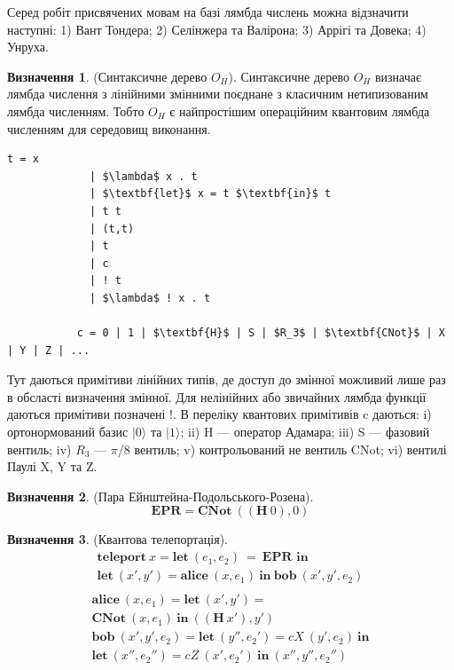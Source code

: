 \documentclass{article}
\theoremstyle{definition}
\newtheorem{definition}{Визначення}
\begin{document}
Серед робіт присвячених мовам на базі лямбда числень можна відзначити наступні:
1) Вант Тондера;
2) Селінжера та Валірона;
3) Аррігі та Довека;
4) Унруха.

\begin{definition} (Синтаксичне дерево $O_H$).
Синтаксичне дерево $O_H$ визначає лямбда числення з лінійними змінними
поєднане з класичним нетипизованим лямбда численням. Тобто $O_H$ є
найпростішим операційним квантовим лямбда численням для середовищ виконання.
\begin{lstlisting}[mathescape=true]
           t = x
             | $\lambda$ x . t
             | $\textbf{let}$ x = t $\textbf{in}$ t
             | t t
             | (t,t)
             | t
             | c
             | ! t
             | $\lambda$ ! x . t

           c = 0 | 1 | $\textbf{H}$ | S | $R_3$ | $\textbf{CNot}$ | X | Y | Z | ...
\end{lstlisting}
Тут даються примітиви лінійних типів, де доступ до змінної
можливий лише раз в обсласті визначення змінної. Для нелінійних або звичайних
лямбда функції даються примітиви позначені !. В переліку квантових примітивів
c даються:
i) ортонормований базис $|0\rangle$ та $|1\rangle$;
ii) H --- оператор Адамара;
iii) S --- фазовий вентиль;
iv) $R_3$ --- $\pi/8$ вентиль;
v) контрольований не вентиль CNot;
vi) вентилі Паулі X, Y та Z.
\end{definition}

\begin{definition} (Пара Ейнштейна-Подольського-Розена).
\begin{equation}
\textbf{EPR} = \textbf{CNot}\ ((\textbf{H}\ 0),0)
\end{equation}
\end{definition}

\begin{definition} (Квантова телепортація).
\begin{multline}
\textbf{teleport}\ x = \textbf{let}\ (e_1,e_2)\ =\ \textbf{EPR in} \\
\textbf{let}\ (x',y') = \textbf{alice}\ (x,e_1)\ \textbf{in}\ \textbf{bob}\ (x',y',e_2) \\
\end{multline}
\begin{multline}
\textbf{alice}\ (x,e_1) = \textbf{let}\ (x',y') = \\
\textbf{CNot}\ (x,e_1)\ \textbf{in}\ ((\textbf{H}\ x'),y') \\
\textbf{bob}\ (x',y',e_2) = \textbf{let}\ (y'',e_2') = cX\ (y',e_2)\ \textbf{in} \\
\textbf{let}\ (x'',e_2'') = cZ\ (x',e_2')\ \textbf{in}\ (x'',y'',e_2'')
\end{multline}
\end{definition}
\end{document}
